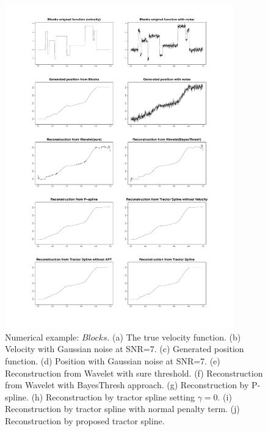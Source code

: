 \begin{figure}
  \centering
   \includegraphics[width=\textwidth,height=14cm]{Chapters/2.TractorSplineTheory/plot/blocks10} 
  \caption{Numerical example: $\textit{Blocks}$. (a) The true velocity function. (b) Velocity with Gaussian noise at SNR=7. (c) Generated position function. (d) Position with Gaussian noise at SNR=7. (e) Reconstruction from Wavelet with sure threshold. (f) Reconstruction from Wavelet with BayesThresh approach. (g) Reconstruction by P-spline. (h) Reconstruction by tractor spline setting $\gamma=0$. (i) Reconstruction by tractor spline with normal penalty term. (j) Reconstruction by proposed tractor spline.}\label{num1}
\end{figure}

